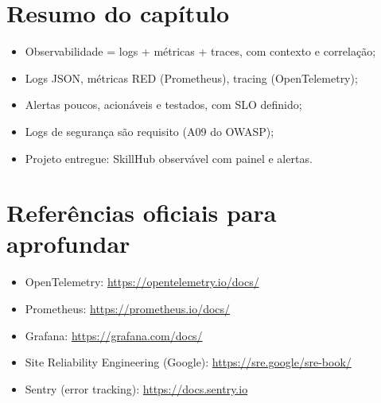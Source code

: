 \section{Resumo do capítulo}

\begin{itemize}[leftmargin=*, itemsep=0.3em]
  \item Observabilidade = logs + métricas + traces, com contexto e correlação;
  \item Logs JSON, métricas RED (Prometheus), tracing (OpenTelemetry);
  \item Alertas poucos, acionáveis e testados, com SLO definido;
  \item Logs de segurança são requisito (A09 do OWASP);
  \item Projeto entregue: SkillHub observável com painel e alertas.
\end{itemize}

\section{Referências oficiais para aprofundar}

\begin{itemize}[leftmargin=*, itemsep=0.3em]
  \item OpenTelemetry: \url{https://opentelemetry.io/docs/}
  \item Prometheus: \url{https://prometheus.io/docs/}
  \item Grafana: \url{https://grafana.com/docs/}
  \item Site Reliability Engineering (Google): \url{https://sre.google/sre-book/}
  \item Sentry (error tracking): \url{https://docs.sentry.io}
\end{itemize}

